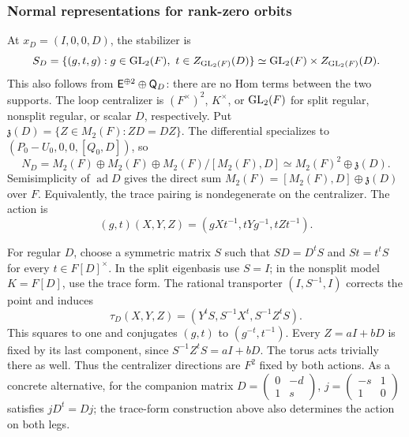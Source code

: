 \subsubsection{Normal representations for rank-zero orbits}\label{m1:subsec:rankzero-normal}
At $x_D=(I,0,0,D)$, the stabilizer is
\[
 S_D=\{(g,t,g):g\in\operatorname{GL}_2(F),\ t\in Z_{\operatorname{GL}_2(F)}(D)\}
 \simeq\operatorname{GL}_2(F)\times Z_{\operatorname{GL}_2(F)}(D).
\]
This also follows from $\mathsf E^{\oplus2}\oplus\mathsf Q_D$: there are no
Hom terms between the two supports. The loop centralizer is
$(F^\times)^2$, $K^\times$, or $\operatorname{GL}_2(F)$ for split regular, nonsplit
regular, or scalar $D$, respectively. Put
$\mathfrak z(D)=\{Z\in M_2(F):ZD=DZ\}$. The differential specializes to
$(P_0-U_0,0,0,[Q_0,D])$, so
\begin{equation}\label{m1:eq:rankzero-normal}
 N_D=M_2(F)\oplus M_2(F)\oplus M_2(F)/[M_2(F),D]
 \simeq M_2(F)^2\oplus\mathfrak z(D).
\end{equation}
Semisimplicity of $\operatorname{ad}D$ gives the direct sum
$M_2(F)=[M_2(F),D]\oplus\mathfrak z(D)$ over $F$. Equivalently, the
trace pairing is nondegenerate on the centralizer. The action is
\begin{equation}\label{m1:eq:rankzero-action}
 (g,t)(X,Y,Z)=(gXt^{-1},tYg^{-1},tZt^{-1}).
\end{equation}

For regular $D$, choose a symmetric matrix $S$ such that $SD=D^tS$
and $St=t^tS$ for every $t\in F[D]^\times$. In the split eigenbasis use
$S=I$; in the nonsplit model $K=F[D]$, use the trace form. The rational
transporter $(I,S^{-1},I)$ corrects the point and induces
\begin{equation}\label{m1:eq:rankzero-transpose}
 \tau_D(X,Y,Z)=(Y^tS,S^{-1}X^t,S^{-1}Z^tS).
\end{equation}
This squares to one and conjugates $(g,t)$ to $(g^{-t},t^{-1})$.
Every $Z=aI+bD$ is fixed by its last component, since
$S^{-1}Z^tS=aI+bD$. The torus acts trivially there as well. Thus the
centralizer directions are $F^2$ fixed by both actions. As a concrete
alternative, for the companion matrix
$D=\left(\begin{smallmatrix}0&-d\\1&s\end{smallmatrix}\right)$,
$j=\left(\begin{smallmatrix}-s&1\\1&0\end{smallmatrix}\right)$ satisfies
$jD^t=Dj$; the trace-form construction above also determines the action
on both legs.

